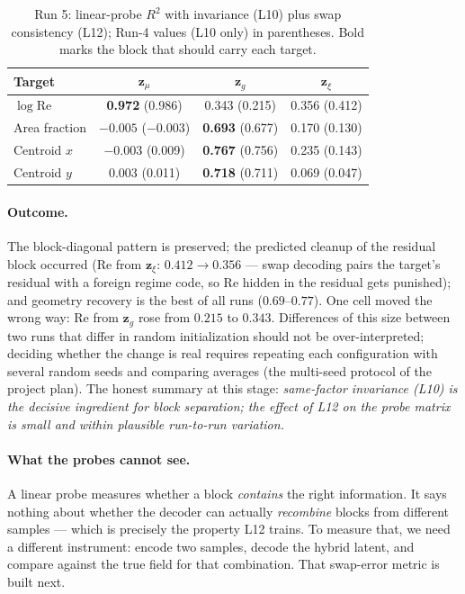 \documentclass[11pt]{article}
\begin{document}
\begin{table}[htbp]
  \centering
  \caption{Run 5: linear-probe $R^2$ with invariance (L10) plus swap
  consistency (L12); Run-4 values (L10 only) in parentheses. Bold marks
  the block that should carry each target.}
  \label{tab:probes-run5}
  \begin{tabular}{lccc}
    \toprule
    Target & $\boldsymbol{z}_{\mu}$ & $\boldsymbol{z}_{g}$ & $\boldsymbol{z}_{\xi}$ \\
    \midrule
    $\log \mathrm{Re}$ & \textbf{0.972} (0.986) & 0.343 (0.215) & 0.356 (0.412) \\
    Area fraction      & $-0.005$ ($-0.003$)    & \textbf{0.693} (0.677) & 0.170 (0.130) \\
    Centroid $x$       & $-0.003$ (0.009)       & \textbf{0.767} (0.756) & 0.235 (0.143) \\
    Centroid $y$       & 0.003 (0.011)          & \textbf{0.718} (0.711) & 0.069 (0.047) \\
    \bottomrule
  \end{tabular}
\end{table}

\paragraph{Outcome.} The block-diagonal pattern is preserved; the
predicted cleanup of the residual block occurred (Re from
$\boldsymbol{z}_{\xi}$: $0.412 \to 0.356$ --- swap decoding pairs the
target's residual with a foreign regime code, so Re hidden in the
residual gets punished); and geometry recovery is the best of all runs
($0.69$--$0.77$). One cell moved the wrong way: Re from
$\boldsymbol{z}_{g}$ rose from $0.215$ to $0.343$. Differences of this
size between two runs that differ in random initialization should not be
over-interpreted; deciding whether the change is real requires repeating
each configuration with several random seeds and comparing averages (the
multi-seed protocol of the project plan). The honest summary at this
stage: \emph{same-factor invariance (L10) is the decisive ingredient for
block separation; the effect of L12 on the probe matrix is small and
within plausible run-to-run variation.}

\paragraph{What the probes cannot see.} A linear probe measures whether a
block \emph{contains} the right information. It says nothing about
whether the decoder can actually \emph{recombine} blocks from different
samples --- which is precisely the property L12 trains. To measure that,
we need a different instrument: encode two samples, decode the hybrid
latent, and compare against the true field for that combination. That
swap-error metric is built next.
\end{document}
